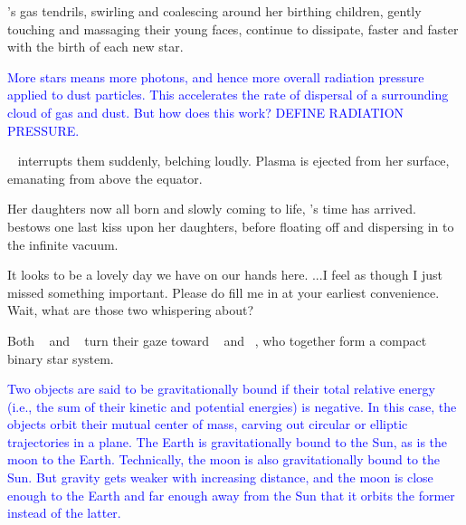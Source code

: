 \documentclass[main.tex]{subfiles}
\begin{document}
\par \nar \rmpleione's gas tendrils, swirling and coalescing around her birthing children, gently touching and massaging their young faces, continue to dissipate, faster and faster with the birth of each new star.

\begin{tcolorbox}[sharp corners, colback=blue!30, colframe=blue!80!blue, title=Radiation Pressure]
\par \textcolor{blue} {More stars means more photons, and hence more overall radiation pressure applied to dust particles.  This accelerates the rate of dispersal of a surrounding cloud of gas and dust.  But how does this work?  DEFINE RADIATION PRESSURE.}
\end{tcolorbox}

\par \nar \rmelectra~ interrupts them suddenly, belching loudly.  Plasma is ejected from her surface, emanating from above the equator.  

\par \nar Her daughters now all born and slowly coming to life, \rmpleione's time has arrived. \rmpleione~ bestows one last kiss upon her daughters, before floating off and dispersing in to the infinite vacuum.

\par \Electra It looks to be a lovely day we have on our hands here. ...I feel as though I just missed something important.  Please do fill me in at your earliest convenience.  Wait, what are those two whispering about?

\par \nar Both \rmmaia~ and \rmelectra~ turn their gaze toward \rmtaygete~ and \rmalcyone~, who together form a compact binary star system.

\begin{tcolorbox}[sharp corners, colback=blue!30, colframe=blue!80!blue, title=Gravitationally Bound]
\par \textcolor{blue} {Two objects are said to be gravitationally bound if their total relative energy (i.e., the sum of their kinetic and potential energies) is negative.  In this case, the objects orbit their mutual center of mass, carving out circular or elliptic trajectories in a plane.  The Earth is gravitationally bound to the Sun, as is the moon to the Earth.  Technically, the moon is also gravitationally bound to the Sun.  But gravity gets weaker with increasing distance, and the moon is close enough to the Earth and far enough away from the Sun that it orbits the former instead of the latter.}  
\end{tcolorbox}
\end{document}
